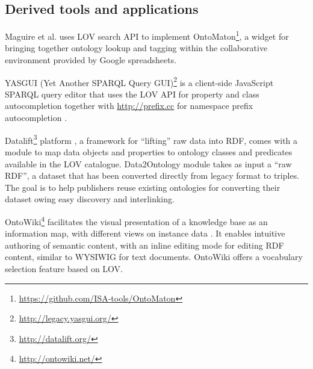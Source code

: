 \documentclass{iosart2c}
\begin{document}
\subsection{Derived tools and applications}

Maguire et al. \cite{ontomaton12} uses LOV search API to implement OntoMaton\footnote{\url{https://github.com/ISA-tools/OntoMaton}}, a widget for bringing together ontology lookup and tagging within the collaborative environment provided by Google spreadsheets. 

YASGUI (Yet Another SPARQL Query GUI)\footnote{\url{http://legacy.yasgui.org/}} is a client-side JavaScript SPARQL query editor that uses the LOV API for property and class autocompletion together with \url{http://prefix.cc} for namespace prefix autocompletion \cite{yasgui}.

Datalift\footnote{\url{http://datalift.org/}} platform \cite{scharffe_2012}, a framework for ``lifting'' raw data into RDF, comes with a module to map data objects and properties to ontology classes and predicates available in the LOV catalogue. Data2Ontology module takes as input a ``raw RDF'', a dataset that has been converted directly from legacy format to triples. The goal is to help publishers reuse existing ontologies for converting their dataset owing easy discovery and interlinking. 

OntoWiki\footnote{\url{http://ontowiki.net/}} facilitates the visual presentation of a knowledge base as an information map, with different views on instance data \cite{auer2006ontowiki}. It enables intuitive authoring of semantic content, with an inline editing mode for editing RDF content, similar to WYSIWIG for text documents. OntoWiki offers a vocabulary selection feature based on LOV.
\end{document}
